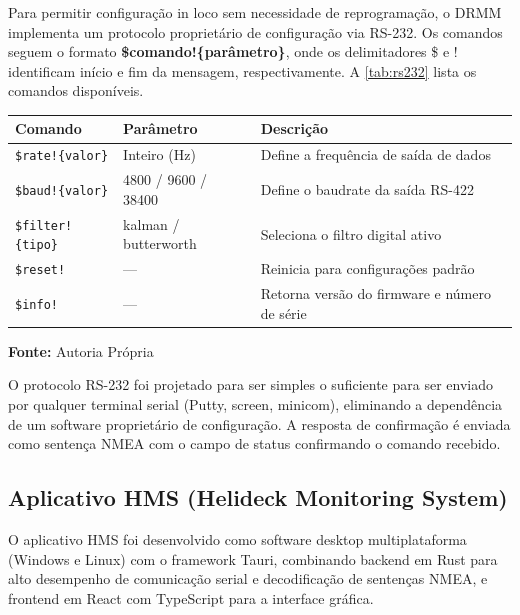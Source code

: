 \documentclass[a4paper, 12pt]{article}
\begin{document}
    Para permitir configuração in loco sem necessidade de reprogramação, o DRMM implementa um protocolo proprietário de configuração via RS-232. Os comandos seguem o formato \textbf{\$comando!\{parâmetro\}}, onde os delimitadores \$ e ! identificam início e fim da mensagem, respectivamente. A \autoref{tab:rs232} lista os comandos disponíveis.

    \begin{table}[!htbp]
        \centering
        \caption{Comandos do Protocolo de Configuração RS-232}
        \label{tab:rs232}
        \vspace{-0.2cm}

        \small
        {\renewcommand{\arraystretch}{1.5}
        \begin{longtable}{|m{3.5cm}|m{4cm}|m{6.5cm}|}
        \hline
            \centering\textbf{Comando} & \centering\textbf{Parâmetro} & \centering\textbf{Descrição}\arraybackslash \\
        \hline
            \texttt{\$rate!\{valor\}} & Inteiro (Hz) & Define a frequência de saída de dados \\
        \hline
            \texttt{\$baud!\{valor\}} & 4800 / 9600 / 38400 & Define o baudrate da saída RS-422 \\
        \hline
            \texttt{\$filter!\{tipo\}} & kalman / butterworth & Seleciona o filtro digital ativo \\
        \hline
            \texttt{\$reset!} & --- & Reinicia para configurações padrão \\
        \hline
            \texttt{\$info!} & --- & Retorna versão do firmware e número de série \\
        \hline
        \end{longtable}}

        \small
        \textbf{Fonte:} Autoria Própria
    \end{table}

    O protocolo RS-232 foi projetado para ser simples o suficiente para ser enviado por qualquer terminal serial (Putty, screen, minicom), eliminando a dependência de um software proprietário de configuração. A resposta de confirmação é enviada como sentença NMEA com o campo de status confirmando o comando recebido.

\subsection{Aplicativo HMS (Helideck Monitoring System)}
    O aplicativo HMS foi desenvolvido como software desktop multiplataforma (Windows e Linux) com o framework Tauri, combinando backend em Rust para alto desempenho de comunicação serial e decodificação de sentenças NMEA, e frontend em React com TypeScript para a interface gráfica.
\end{document}
